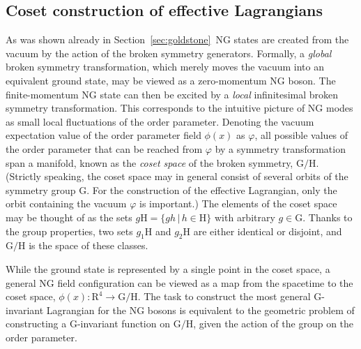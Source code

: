 \documentclass[final,3p,times,12pt,a4paper,sort&compress]{elsarticle}
\newcommand\gr[1]{\mathrm{#1}}              %
\newcommand\vp{\varphi}
\begin{document}
\subsection{Coset construction of effective Lagrangians}
As was shown already in Section~\ref{sec:goldstone}\ NG states are created
from the vacuum by the action of the broken symmetry generators. Formally, a
\emph{global} broken symmetry transformation, which merely moves the vacuum
into an equivalent ground state, may be viewed as a zero-momentum NG boson. The
finite-momentum NG state can then be excited by a \emph{local} infinitesimal
broken symmetry transformation. This corresponds to the intuitive picture of NG
modes as small local fluctuations of the order parameter. Denoting the vacuum
expectation value of the order parameter field $\phi(x)$ as $\vp$, all possible
values of the order parameter that can be reached from $\vp$ by a symmetry
transformation span a manifold, known as the \emph{coset space} of the
broken symmetry, $\gr{G/H}$. (Strictly speaking, the coset space may in general
consist of several orbits of the symmetry group $\gr G$. For the construction
of the effective Lagrangian, only the orbit containing the vacuum $\vp$ is
important.) The elements of the coset space may be thought of as the sets $g\gr
H=\{gh\,|\,h\in\gr H\}$ with arbitrary $g\in\gr G$. Thanks to the group
properties, two sets $g_1\gr H$ and $g_2\gr H$ are either identical or disjoint,
and $\gr{G/H}$ is the space of these classes.

While the ground state is represented by a single point in the coset space, a
general NG field configuration can be viewed as a map from the spacetime to the
coset space, $\phi(x):\gr{R^4}\to\gr{G/H}$. The task to construct the most
general $\gr G$-invariant Lagrangian for the NG bosons is equivalent to the
geometric problem of constructing a $\gr G$-invariant function on $\gr{G/H}$,
given the action of the group on the order parameter.
\end{document}
